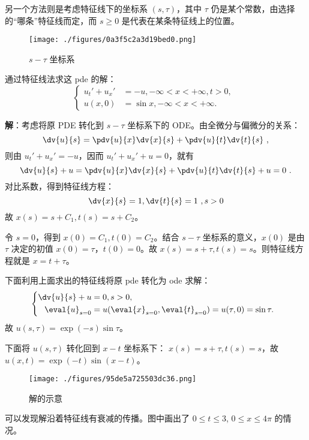另一个方法则是考虑特征线下的坐标系 $(s, \tau)$，其中 $\tau$ 仍是某个常数，由选择的“哪条”特征线而定，而 $s \ge 0$ 是代表在某条特征线上的位置。
\begin{figure}[ht]
\centering
\texttt{[image: ./figures/0a3f5c2a3d19bed0.png]}
\caption{$s-\tau$ 坐标系\cite{SJFPDE}} \label{fig_chacur_1}
\end{figure}


\begin{example}{}
通过特征线法求这 pde 的解：
$$
\left\{
\begin{aligned}
{u_t'} + {u_x'} &= -u, -\infty < x < +\infty, t > 0, \\
u(x, 0) &= \sin x, -\infty < x < +\infty .
\end{aligned}
\right.
~~
$$

\textbf{解}：考虑将原 PDE 转化到 $s-\tau$ 坐标系下的 ODE。由全微分与偏微分的关系：
$$
\dv{u}{s} = \pdv{u}{x} \dv{x}{s} + \pdv{u}{t} \dv{t}{s}~,
$$
则由 $u_t' + u_x' = -u$，因而 $u_t' + u_x' + u = 0$，就有
$$\dv{u}{s} + u = \pdv{u}{x} \dv{x}{s} + \pdv{u}{t} \dv{t}{s} + u = 0 ~.$$
对比系数，得到特征线方程：
$$\dv{x}{s} = 1, \dv{t}{s} = 1~, s>0$$
故 $x(s) = s+C_1, t(s) = s+C_2$。

令 $s=0$，得到 $x(0) = C_1, t(0) = C_2$。结合 $s-\tau$ 坐标系的意义，$x(0)$ 是由 $\tau$ 决定的初值 $x(0) = \tau$，$t(0)=0$。故 $x(s) = s+\tau, t(s)=s$。则特征线方程就是 $x = t+\tau$。

下面利用上面求出的特征线将原 pde 转化为 ode 求解：
$$
\left\{
\begin{aligned}
\dv{u}{s} +u &= 0, s>0, \\
\eval{u}_{s=0} &= u(\eval{x}_{s=0}, \eval{t}_{s=0}) = u(\tau, 0) = \sin \tau .
\end{aligned}    
\right.~~$$
故 $u(s,\tau) = \exp(-s) \sin \tau$。

下面将 $u(s, \tau)$ 转化回到 $x-t$ 坐标系下：
$x(s) = s + \tau, t(s) = s$，故 $u(x, t) = \exp(-t)\sin(x-t) $。

\begin{figure}[ht]
\centering
\texttt{[image: ./figures/95de5a725503dc36.png]}
\caption{解的示意} \label{fig_chacur_2}
\end{figure}
可以发现解沿着特征线有衰减的传播。图中画出了 $0\le t\le3$, $0\le x \le 4 \pi$ 的情况。
\end{example}



























